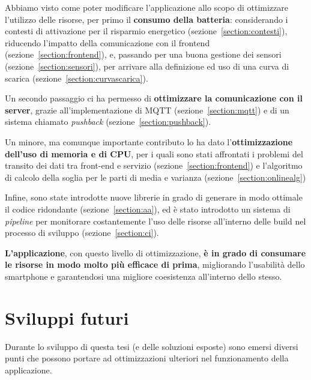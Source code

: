 \documentclass[a4paper,10pt]{memoir}
\begin{document}
Abbiamo visto come poter modificare l'applicazione allo scopo di ottimizzare l'utilizzo delle risorse, per primo il \textbf{consumo della batteria}: considerando i contesti di attivazione per il risparmio energetico (sezione~\ref{section:contesti}), riducendo l'impatto della comunicazione con il frontend (sezione~\ref{section:frontend}), e, passando per una buona gestione dei sensori (sezione~\ref{section:sensori}), per arrivare alla definizione ed uso di una curva di scarica (sezione~\ref{section:curvascarica}).

\medskip

Un secondo passaggio ci ha permesso di \textbf{ottimizzare la comunicazione con il server}, grazie all'implementazione di MQTT (sezione~\ref{section:mqtt}) e di un sistema chiamato \textit{pushback} (sezione~\ref{section:pushback}).

\medskip

Un minore, ma comunque importante contributo lo ha dato l'\textbf{ottimizzazione dell'uso di memoria e di CPU}, per i quali sono stati affrontati i problemi del transito dei dati tra front-end e servizio (sezione~\ref{section:frontend}) e l'algoritmo di calcolo della soglia per le parti di media e varianza (sezione~\ref{section:onlinealg})

\medskip

Infine, sono state introdotte nuove librerie in grado di generare in modo ottimale il codice ridondante (sezione~\ref{section:aa}), ed è stato introdotto un sistema di \textit{pipeline} per monitorare costantemente l'uso delle risorse all'interno delle build nel processo di sviluppo (sezione~\ref{section:ci}).

\vspace*{1cm}

\textbf{L'applicazione}, con questo livello di ottimizzazione, \textbf{è in grado di consumare le risorse in modo molto più efficace di prima}, migliorando l'usabilità dello smartphone e garantendosi una migliore coesistenza all'interno dello stesso.

\clearpage

\section{Sviluppi futuri}

Durante lo sviluppo di questa tesi (e delle soluzioni esposte) sono emersi diversi punti che possono portare ad ottimizzazioni ulteriori nel funzionamento della applicazione.
\end{document}
